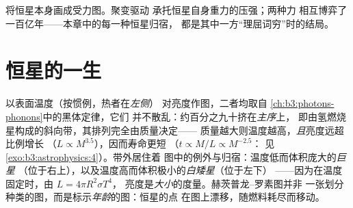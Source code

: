 \begin{omfigure}

{\small 将恒星本身画成受力图。聚变驱动
承托恒星自身重力的压强；两种力
相互博弈了一百亿年——本章中的每一种恒星归宿，
都是其中一方“理屈词穷”时的结局。}
\end{omfigure}

\section{恒星的一生}

\begin{definition}\label{def:b3:astrophysics:hr}
以表面温度（按惯例，热者在\emph{左侧}）
对亮度作图，二者均取自
\cref{ch:b3:photons-phonons}中的黑体定律，它们
并不散乱：约百分之九十挤在\emph{主序}上，
即由氢燃烧星构成的斜向带，其排列完全由质量决定——
质量越大则温度越高，\emph{且}亮度远超比例增长
（$L \propto M^{3.5}$），因而寿命更短
（$t \propto M/L \propto M^{-2.5}$：
见\cref{exo:b3:astrophysics:4}）。带外居住着
图中的例外与归宿：温度低而体积庞大的\emph{巨星}
（位于右上），以及温度高而体积极小的\emph{白矮星}（位于左下）
——因为在温度固定时，由 $L = 4\pi R^2\sigma T^4$，
亮度是\emph{大小}的度量。赫茨普龙–罗素图并非
一张划分种类的图，而是标示\emph{年龄}的图：恒星的点
在图上漂移，随燃料耗尽而移动。
\end{definition}


